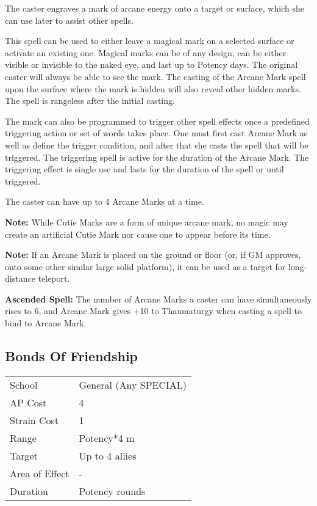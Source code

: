 \documentclass[11pt,a4paper,twocolumn]{book}
\begin{document}
\medskip

The caster engraves a mark of arcane energy onto a target or surface, which she can use later to assist other spells.

This spell can be used to either leave a magical mark on a selected surface or activate an existing one. Magical marks can be of any design, can be either visible or invisible to the naked eye, and last up to Potency days. The original caster will always be able to see the mark. The casting of the Arcane Mark spell upon the surface where the mark is hidden will also reveal other hidden marks. The spell is rangeless after the initial casting.

The mark can also be programmed to trigger other spell effects once a predefined triggering action or set of words takes place. One must first cast Arcane Mark as well as define the trigger condition, and after that she casts the spell that will be triggered. The triggering spell is active for the duration of the Arcane Mark. The triggering effect is single use and lasts for the duration of the spell or until triggered.

The caster can have up to 4 Arcane Marks at a time.

\textbf{Note:} While Cutie Marks are a form of unique arcane mark, no magic may create an artificial Cutie Mark nor cause one to appear before its time.

\textbf{Note:} If an Arcane Mark is placed on the ground or floor (or, if GM approves, onto some other similar large solid platform), it can be used as a target for long-distance teleport.

\bigskip

\textbf{Ascended Spell:} The number of Arcane Marks a caster can have simultaneously rises to 6, and Arcane Mark gives +10 to Thaumaturgy when casting a spell to bind to Arcane Mark. 

\medskip

\subsection*{Bonds Of Friendship}

{
	\begin{tabu} to 75mm{| X[l,4] | X[l,7] |}
		\hline
		School 			& General (Any SPECIAL) 	\\
		AP Cost	      	& 4 					\\
		Strain Cost     & 1 					\\
		Range     		& Potency*4 m 			\\
		Target      	& Up to 4 allies			\\
		Area of Effect  & - 	 				\\
		Duration     	& Potency rounds 		\\ \hline
	\end{tabu}
	
}
\end{document}
